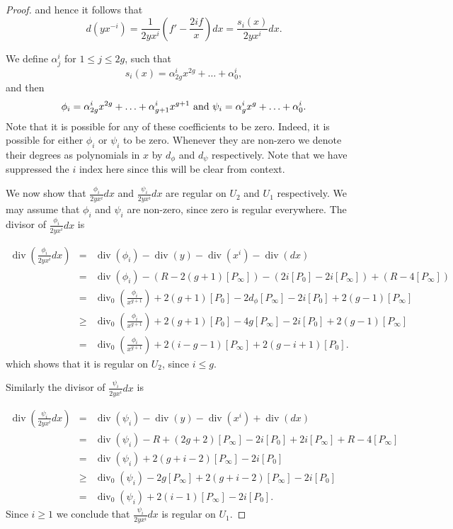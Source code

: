 \documentclass[draft, 11pt]{article} %
\theoremstyle{plain}
\theoremstyle{remark}
\DeclareMathOperator{\di}{div}
\begin{document}
\begin{proof}
and hence it follows that 
\begin{equation*}
d \left( yx^{-i} \right) = \frac{1}{2yx^{i}}\left( f' - \frac{2if}{x} \right) dx = \frac{s_i(x)}{2yx^i}dx.
\end{equation*}

We define $\alpha^i_j$ for $1\leq j \leq 2g$, such that
\[
	s_i(x) = \alpha^i_{2g}x^{2g} + \ldots + \alpha^i_0, 
\]
and then 
\[
\phi_i = \alpha^i_{2g}x^{2g} + \ldots + \alpha^i_{g+1}x^{g+1} \ {\rm and } \ \psi_i = \alpha^i_gx^g + \ldots + \alpha^i_0.
\]
Note that it is possible for any of these coefficients to be zero. Indeed, it is possible for either $\phi_i$ or $\psi_i$ to be zero.
Whenever they are non-zero we denote their degrees as polynomials in $x$ by $d_\phi$ and $d_\psi$ respectively.
Note that we have suppressed the $i$ index here since this will be clear from context.


We now show that $\frac{\phi_i}{2yx^i}dx$ and $\frac{\psi_i}{2yx^i}dx$ are regular on $U_2$ and $U_1$ respectively.
We may assume that $\phi_i$ and $\psi_i$ are non-zero, since zero is regular everywhere.
The divisor of $\frac{\phi_i}{2yx^i}dx$ is

\begin{eqnarray*}
\di\left( \frac{\phi_i}{2yx^i}dx \right) & = & \di(\phi_i) -\di(y) - \di(x^i) - \di (dx) \\
& = & \di(\phi_i) - ( R - 2(g+1)[P_\infty]) - (2i[P_0] - 2i[P_\infty]) + (R - 4[P_\infty]) \\
& = & \di_0\left( \frac{\phi_i}{x^{g+1}}\right) + 2(g+1)[P_0] - 2d_\phi[P_\infty] - 2i[P_0] + 2(g-1)[P_\infty] \\
& \geq & \di_0\left( \frac{\phi_i}{x^{g+1}}\right) + 2(g+1)[P_0] - 4g[P_\infty] - 2i[P_0] + 2(g-1)[P_\infty] \\
& = & \di_0\left( \frac{\phi_i}{x^{g+1}} \right) + 2(i-g-1)[P_\infty] + 2(g-i+1)[P_0].
\end{eqnarray*}
which shows that it is regular on $U_2$, since $i \leq g$.

Similarly the divisor of $\frac{\psi_i}{2yx^i}dx$ is 

\begin{eqnarray*}
\di \left( \frac{\psi_i}{2yx^i}dx\right) & = & \di(\psi_i) - \di(y) - \di(x^i) + \di (dx) \\
& = & \di (\psi_i ) -R + (2g+2)[P_\infty] - 2i[P_0] + 2i[P_\infty] + R -4[P_\infty] \\
& =  & \di(\psi_i) + 2(g+i-2)[P_\infty] -2i[P_0] \\
& \geq & \di_0(\psi_i) - 2g[P_\infty] + 2(g+i-2)[P_\infty] -2i[P_0] \\
& = & \di_0(\psi_i) + 2(i-1)[P_\infty] - 2i[P_0].
\end{eqnarray*}
Since $i\geq 1$ we conclude that $\frac{\psi_i}{2yx^i}dx$ is regular on $U_1$.


\end{proof}
\end{document}
